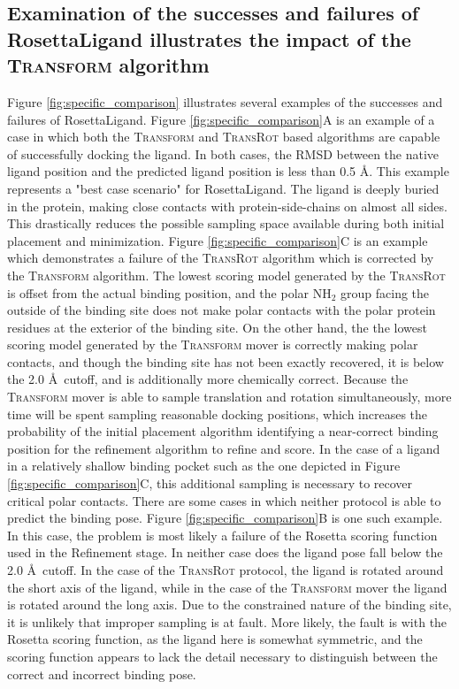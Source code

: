 \subsection{Examination of the successes and failures of RosettaLigand illustrates the impact of the \textsc{Transform} algorithm}
Figure \ref{fig:specific_comparison} illustrates several examples of the successes and failures of RosettaLigand.
Figure \ref{fig:specific_comparison}A is an example of a case in which both the \textsc{Transform} and \textsc{TransRot} based algorithms are capable of successfully docking the ligand.
In both cases, the \ac{RMSD} between the native ligand position and the predicted ligand position is less than 0.5 \AA.  This example represents a "best case scenario" for RosettaLigand.
The ligand is deeply buried in the protein, making close contacts with protein-side-chains on almost all sides.
This drastically reduces the possible sampling space available during both initial placement and minimization.
Figure \ref{fig:specific_comparison}C is an example which demonstrates a failure of the \textsc{TransRot} algorithm which is corrected by the \textsc{Transform} algorithm.
The lowest scoring model generated by the \textsc{TransRot} is offset from the actual binding position, and the polar NH$_{2}$ group facing the outside of the binding site does not make polar contacts with the polar protein residues at the exterior of the binding site. 
On the other hand, the the lowest scoring model generated by the \textsc{Transform} mover is correctly making polar contacts, and though the binding site has not been exactly recovered, it is below the 2.0 \AA\ cutoff, and is additionally more chemically correct.
Because the \textsc{Transform} mover is able to sample translation and rotation simultaneously, more time will be spent sampling reasonable docking positions, which increases the probability of the initial placement algorithm identifying a near-correct binding position for the refinement algorithm to refine and score.
In the case of a ligand in a relatively shallow binding pocket such as the one depicted in Figure \ref{fig:specific_comparison}C, this additional sampling is necessary to recover critical polar contacts. 
There are some cases in which neither protocol is able to predict the binding pose.
Figure \ref{fig:specific_comparison}B is one such example.  In this case, the problem is most likely a failure of the Rosetta scoring function used in the Refinement stage.
In neither case does the ligand pose fall below the 2.0 \AA\ cutoff.  In the case of the \textsc{TransRot} protocol, the ligand is rotated around the short axis of the ligand, while in the case of the \textsc{Transform} mover the ligand is rotated around the long axis.
Due to the constrained nature of the binding site, it is unlikely that improper sampling is at fault.
More likely, the fault is with the Rosetta scoring function, as the ligand here is somewhat symmetric, and the scoring function appears to lack the detail necessary to distinguish between the correct and incorrect binding pose. 


